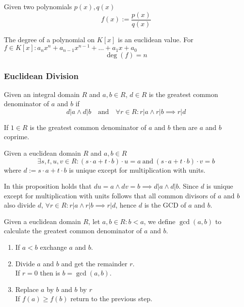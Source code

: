 \begin{definition}
   Given two polynomials \(p(x), q(x)\)
   \[f(x) := \frac{p(x)}{q(x)}\]
\end{definition}

\begin{proposition}
   The degree of a polynomial on \(K[x]\) is an euclidean value.
   For \(f \in K[x]: a_nx^n + a_{n-1}x^{n-1} + \ldots + a_1x + a_0\)
   \[\deg(f) = n\]
\end{proposition}

\subsubsection{Euclidean Division}
\begin{definition}
   Given an integral domain \(R\) and \(a, b \in R\), \(d \in R\) is the greatest common denominator of \(a\) and \(b\) if
   \[d|a \land d|b \quad\text{and}\quad \forall r \in R: r|a \land r|b \implies r|d\]
\end{definition}
\begin{remark}
   If \(1 \in R\) is the greatest common denominator of \(a\) and \(b\) then are \(a\) and \(b\) coprime.
\end{remark}

\begin{proposition}\label{pro:factor_unique}
   Given a euclidean domain \(R\) and \(a, b \in R\)
   \[\exists s, t, u, v \in R: (s \cdot a + t \cdot b) \cdot u = a~\text{and}~(s \cdot a + t \cdot b) \cdot v = b\]
   where \(d := s \cdot a + t \cdot b\) is unique except for multiplication with units.
\end{proposition}
\begin{remark}
   In this proposition holds that \(du = a \land dv = b \implies d|a \land d|b\).
   Since \(d\) is unique except for multiplication with units follows that all common divisors of \(a\) and \(b\) also divide \(d\), \(\forall r \in R: r|a \land r|b \implies r|d\), hence \(d\) is the GCD of \(a\) and \(b\).
\end{remark}

\begin{definition}
   Given a euclidean domain \(R\), let \(a, b \in R: b < a\), we define \(\gcd(a, b)\) to calculate the greatest common denominator of \(a\) and \(b\).
   \begin{enumerate}
      \item If \(a < b\) exchange \(a\) and \(b\).
      \item Divide \(a\) and \(b\) and get the remainder \(r\).\\
         If \(r = 0\) then is \(b = \gcd(a, b)\).
      \item Replace \(a\) by \(b\) and \(b\) by \(r\)\\
         If \(f(a) \geq f(b)\) return to the previous step.
   \end{enumerate}
\end{definition}

